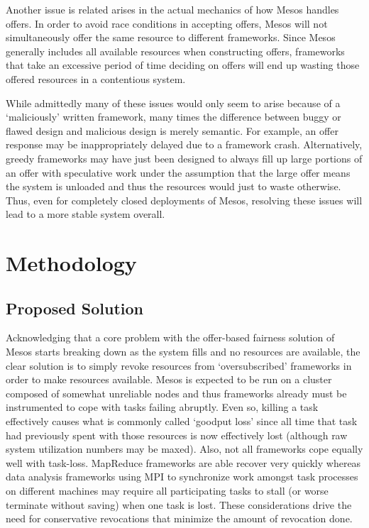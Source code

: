 Another issue is related arises in the actual mechanics of how Mesos handles offers. In order
to avoid race conditions in accepting offers, Mesos will not simultaneously offer the same
resource to different frameworks. Since Mesos generally includes all available resources when
constructing offers, frameworks that take an excessive period of time deciding on offers will
end up wasting those offered resources in a contentious system.

While admittedly many of these issues would only seem to arise because of a `maliciously'
written framework, many times the difference between buggy or flawed design and malicious
design is merely semantic. For example, an offer response may be inappropriately delayed due to
a framework crash. Alternatively, greedy frameworks may have just been designed to always fill
up large portions of an offer with speculative work under the assumption that the large offer
means the system is unloaded and thus the resources would just to waste otherwise. Thus, even
for completely closed deployments of Mesos, resolving these issues will lead to a more stable
system overall. 

\section{Methodology}
\subsection{Proposed Solution}
Acknowledging that a core problem with the offer-based fairness solution of Mesos starts
breaking down as the system fills and no resources are available, the clear solution is to
simply revoke resources from `oversubscribed' frameworks in order to make resources available.
Mesos is expected to be run on a cluster composed of somewhat unreliable nodes and thus
frameworks already must be instrumented to cope with tasks failing abruptly. Even so, killing a
task effectively causes what is commonly called `goodput loss' since all time that task had
previously spent with those resources is now effectively lost (although raw system utilization
numbers may be maxed). Also, not all frameworks cope equally well with task-loss. MapReduce
frameworks are able recover very quickly whereas data analysis frameworks using MPI to
synchronize work amongst task processes on different machines may require all participating
tasks to stall (or worse terminate without saving) when one task is lost. These considerations
drive the need for conservative revocations that minimize the amount of revocation done.

